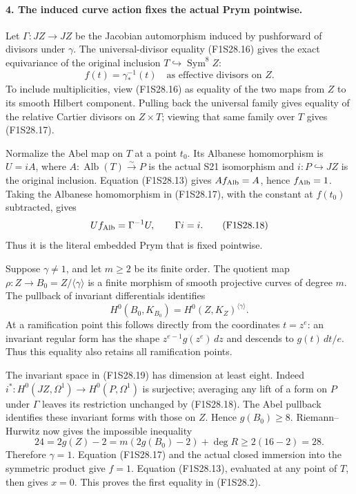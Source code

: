 \paragraph{4. The induced curve action fixes the actual Prym pointwise.}
Let $\Gamma:JZ\to JZ$ be the Jacobian automorphism
induced by pushforward of divisors under $\gamma$.
The universal-divisor equality (F1S28.16) gives the exact
equivariance of the original inclusion $T\hookrightarrow
\operatorname{Sym}^8Z$:
\[
                         f(t)=\gamma^{-1}_*(t)
                       \quad\text{as effective divisors on }Z.
 \tag{F1S28.17}
\]
To include multiplicities, view (F1S28.16) as equality
of the two maps from $Z$ to its smooth Hilbert component.
Pulling back the universal family gives equality of the
relative Cartier divisors on $Z\times T$; viewing that
same family over $T$ gives (F1S28.17).

Normalize the Abel map on $T$ at a point $t_0$. Its
Albanese homomorphism is $U=iA$, where
$A:\operatorname{Alb}(T)\xrightarrow{\sim}P$ is the
actual S21 isomorphism and $i:P\hookrightarrow JZ$
is the original inclusion. Equation (F1S28.13) gives
$A f_{\rm Alb}=A$, hence $f_{\rm Alb}=1$. Taking the
Albanese homomorphism in (F1S28.17), with the constant
at $f(t_0)$ subtracted, gives
\[
                    U f_{\rm Alb}=\Gamma^{-1}U,
                         \qquad \Gamma i=i.
 \tag{F1S28.18}
\]
Thus it is the literal embedded Prym that is fixed
pointwise.

Suppose $\gamma\ne1$, and let $m\ge2$ be its finite
order. The quotient map $\rho:Z\to B_0=Z/\langle\gamma\rangle$
is a finite morphism of smooth projective curves of
degree $m$. The pullback of invariant differentials
identifies
\[
           H^0(B_0,K_{B_0})
                  =H^0(Z,K_Z)^{\langle\gamma\rangle}.
 \tag{F1S28.19}
\]
At a ramification point this follows directly from
the coordinates $t=z^e$: an invariant regular form
has the shape $z^{e-1}g(z^e)\,dz$ and descends to
$g(t)\,dt/e$. Thus this equality also retains all
ramification points.

The invariant space in (F1S28.19) has dimension at
least eight. Indeed $i^*:H^0(JZ,\Omega^1)\to
H^0(P,\Omega^1)$ is surjective; averaging any lift
of a form on $P$ under $\Gamma$ leaves its restriction
unchanged by (F1S28.18). The Abel pullback identifies
these invariant forms with those on $Z$. Hence
$g(B_0)\ge8$. Riemann--Hurwitz now gives the impossible
inequality
\[
          24=2g(Z)-2=m(2g(B_0)-2)+\deg R
                                      \ge2(16-2)=28.
 \tag{F1S28.20}
\]
Therefore $\gamma=1$. Equation (F1S28.17) and the
actual closed immersion into the symmetric product
give $f=1$. Equation (F1S28.13), evaluated at any
point of $T$, then gives $x=0$. This proves the first
equality in (F1S28.2).


